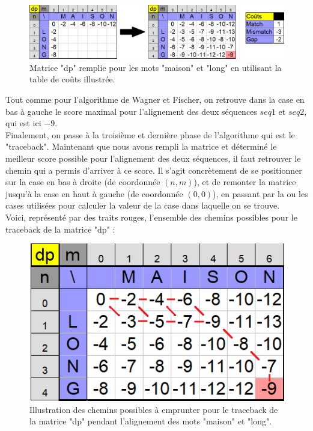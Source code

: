 \documentclass[12pt]{article}
\begin{document}
\begin{figure}[!h]
    \centering
    \includegraphics[scale = 0.55]{Images/Needleman/needleman rempli.png}
    \caption{Matrice "dp" remplie pour les mots "maison" et "long" en utilisant la table de coûts illustrée.}
    \label{fig:Matrice "dp" remplis pour les mots "maison" et "long" en utilisant la table de coûts illustrée.}
\end{figure}

Tout comme pour l'algorithme de Wagner et Fischer, on retrouve dans la case en bas à gauche le score maximal pour l'alignement des deux séquences $seq1$ et $seq2$, qui est ici $-9$.\\

Finalement, on passe à la troisième et dernière phase de l'algorithme qui est le "traceback". Maintenant que nous avons rempli la matrice et déterminé le meilleur score possible pour l'alignement des deux séquences, il faut retrouver le chemin qui a permis d'arriver à ce score. Il s'agit concrètement de se positionner sur la case en bas à droite (de coordonnée $(n,m)$), et de remonter la matrice jusqu'à la case en haut à gauche (de coordonnée $(0,0)$), en passant par la ou les cases utilisées pour calculer la valeur de la case dans laquelle on se trouve.\\

Voici, représenté par des traits rouges, l'ensemble des chemins possibles pour le traceback de la matrice "dp" :\\

\begin{figure}[!h]
    \centering
    \includegraphics[scale = 0.85]{Images/Needleman/chemins needleman.png}
    \caption{Illustration des chemins possibles à emprunter pour le traceback de la matrice "dp" pendant l'alignement des mots "maison" et "long".}
    \label{fig:Matrice "dp" remplis pour les mots "maison" et "long" en utilisant la table de coûts illustrée.}
\end{figure}
\end{document}
